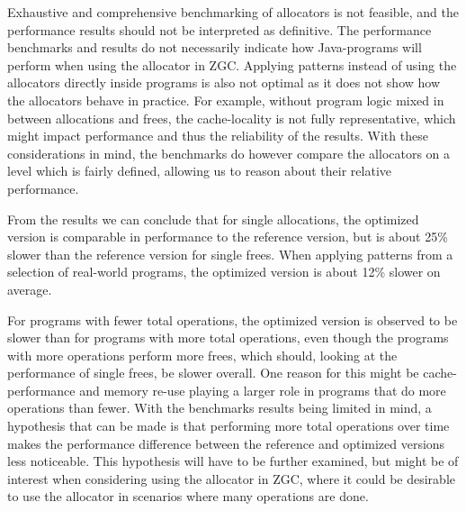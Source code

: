 


Exhaustive and comprehensive benchmarking of allocators is not feasible, and the performance results should not be interpreted as definitive. The performance benchmarks and results do not necessarily indicate how Java-programs will perform when using the allocator in ZGC. Applying patterns instead of using the allocators directly inside programs is also not optimal as it does not show how the allocators behave in practice. For example, without program logic mixed in between allocations and frees, the cache-locality is not fully representative, which might impact performance and thus the reliability of the results. With these considerations in mind, the benchmarks do however compare the allocators on a level which is fairly defined, allowing us to reason about their relative performance. 

From the results we can conclude that for single allocations, the optimized version is comparable in performance to the reference version, but is about 25\% slower than the reference version for single frees. When applying patterns from a selection of real-world programs, the optimized version is about 12\% slower on average. 

For programs with fewer total operations, the optimized version is observed to be slower than for programs with more total operations, even though the programs with more operations perform more frees, which should, looking at the performance of single frees, be slower overall. One reason for this might be cache-performance and memory re-use playing a larger role in programs that do more operations than fewer. With the benchmarks results being limited in mind, a hypothesis that can be made is that performing more total operations over time makes the performance difference between the reference and optimized versions less noticeable. This hypothesis will have to be further examined, but might be of interest when considering using the allocator in ZGC, where it could be desirable to use the allocator in scenarios where many operations are done.


